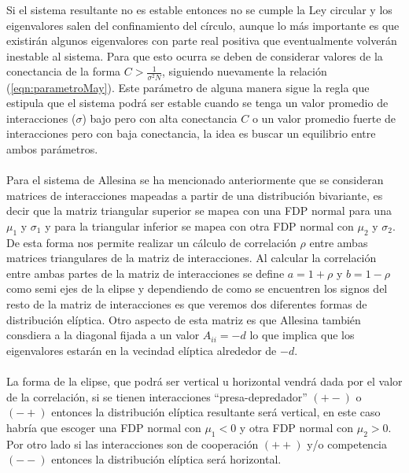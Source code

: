 Si el sistema resultante no es estable entonces no se cumple la Ley circular y los eigenvalores salen del confinamiento del círculo, aunque lo más importante es que existirán algunos eigenvalores con parte real positiva que eventualmente volverán inestable al sistema. Para que esto ocurra se deben de considerar valores de la conectancia de la forma $C>\frac{1}{\sigma^2 N}$, siguiendo nuevamente la relación (\ref{eqn:parametroMay}). Este parámetro de alguna manera sigue la regla que estipula que el sistema podrá ser estable cuando se tenga un valor promedio de interacciones ($\sigma$) bajo pero con alta conectancia $C$ o un valor promedio fuerte de interacciones pero con baja conectancia, la idea es buscar un equilibrio entre ambos parámetros.\\
\\
Para el sistema de Allesina se ha mencionado anteriormente que se consideran matrices de interacciones mapeadas a partir de una distribución bivariante, es decir que la matriz triangular superior se mapea con una FDP normal para una $\mu_1$ y $\sigma_1$ y para la triangular inferior se mapea con otra FDP normal con $\mu_2$ y $\sigma_2$. De esta forma nos permite realizar un cálculo de correlación $\rho$ entre ambas matrices triangulares de la matriz de interacciones. Al calcular la correlación entre ambas partes de la matriz de interacciones se define $a=1+\rho$ y $b=1-\rho$ como semi ejes de la elipse y dependiendo de como se encuentren los signos del resto de la matriz de interacciones es que veremos dos diferentes formas de distribución elíptica. Otro aspecto de esta matriz es que Allesina también consdiera a la diagonal fijada a un valor $A_{ii}= -d$ lo que implica que los eigenvalores estarán en la vecindad elíptica alrededor de $-d$.
\\
\\
La forma de la elipse, que podrá ser vertical u horizontal vendrá dada por el valor de la correlación, si se tienen interacciones ``presa-depredador'' $(+-)$ o $(-+)$ entonces la distribución elíptica resultante será vertical, en este caso habría que escoger una FDP normal con $\mu_1<0$ y otra FDP normal con $\mu_2>0$. Por otro lado si las interacciones son de cooperación $(++)$ y/o competencia $(--)$ entonces la distribución elíptica será horizontal.
